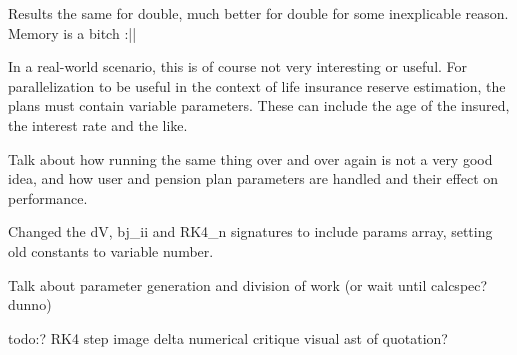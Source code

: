 Results the same for double, much better for double for some inexplicable reason. Memory is a bitch :||




In a real-world scenario, this is of course not very interesting or useful.
For parallelization to be useful in the context of life insurance reserve estimation, the plans must contain variable parameters.
These can include the age of the insured, the interest rate and the like.



Talk about how running the same thing over and over again is not a very good idea, and how user and pension plan parameters are handled and their effect on performance.

Changed the dV, bj\_ii and RK4\_n signatures to include params array, setting old constants to variable number.

Talk about parameter generation and division of work (or wait until calcspec? dunno)


todo:?
RK4 step image
delta numerical critique
visual ast of quotation?